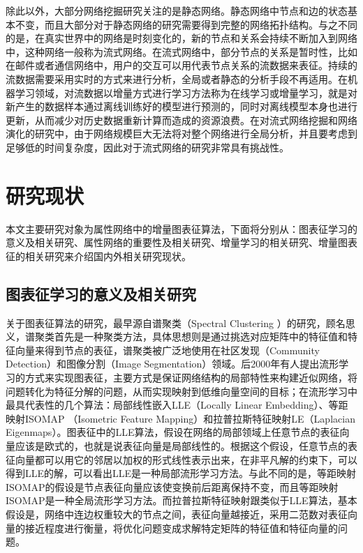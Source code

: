 除此以外，大部分网络挖掘研究关注的是静态网络。静态网络中节点和边的状态基本不变，而且大部分对于静态网络的研究需要得到完整的网络拓扑结构。与之不同的是，在真实世界中的网络是时刻变化的，新的节点和关系会持续不断加入到网络中，这种网络一般称为流式网络\cite{aggarwal2014evolutionary}。在流式网络中，部分节点的关系是暂时性，比如在邮件或者通信网络中，用户的交互可以用代表节点关系的流数据来表征。持续的流数据需要采用实时的方式来进行分析，全局或者静态的分析手段不再适用。在机器学习领域，对流数据以增量方式进行学习方法称为在线学习或增量学习，就是对新产生的数据样本通过离线训练好的模型进行预测的，同时对离线模型本身也进行更新，从而减少对历史数据重新计算而造成的资源浪费。在对流式网络挖掘和网络演化的研究中，由于网络规模巨大无法将对整个网络进行全局分析，并且要考虑到足够低的时间复杂度，因此对于流式网络的研究非常具有挑战性\cite{zhao2011gsketch,le2012linked}。

\section{研究现状}
本文主要研究对象为属性网络中的增量图表征算法，下面将分别从：图表征学习的意义及相关研究、属性网络的重要性及相关研究、增量学习的相关研究、增量图表征的相关研究来介绍国内外相关研究现状。
\subsection{图表征学习的意义及相关研究}


关于图表征算法的研究，最早源自谱聚类（Spectral Clustering ）的研究，顾名思义，谱聚类首先是一种聚类方法，具体思想则是通过挑选对应矩阵中的特征值和特征向量来得到节点的表征，谱聚类被广泛地使用在社区发现（Community Detection）\cite{leskovec2010empirical}和图像分割（Image Segmentation）\cite{shi2000normalized}领域。后2000年有人提出流形学习的方式来实现图表征，主要方式是保证网络结构的局部特性来构建近似网络，将问题转化为特征分解的问题，从而实现映射到低维向量空间的目标；在流形学习中最具代表性的几个算法：局部线性嵌入LLE\cite{roweis2000nonlinear}（Locally Linear Embedding）、等距映射ISOMAP\cite{tenenbaum2000global} （Isometric Feature Mapping）和拉普拉斯特征映射LE\cite{belkin2002laplacian}（Laplacian Eigenmaps）。图表征中的LLE算法，假设在网络的局部领域上任意节点的表征向量应该是欧式的，也就是说表征向量是局部线性的。根据这个假设，任意节点的表征向量都可以用它的邻居以加权的形式线性表示出来，在非平凡解的约束下，可以得到LLE的解，可以看出LLE是一种局部流形学习方法。与此不同的是，等距映射ISOMAP的假设是节点表征向量应该使变换前后距离保持不变，而且等距映射ISOMAP是一种全局流形学习方法。而拉普拉斯特征映射跟类似于LLE算法，基本假设是，网络中连边权重较大的节点之间，表征向量越接近，采用二范数对表征向量的接近程度进行衡量，将优化问题变成求解特定矩阵的特征值和特征向量的问题。

